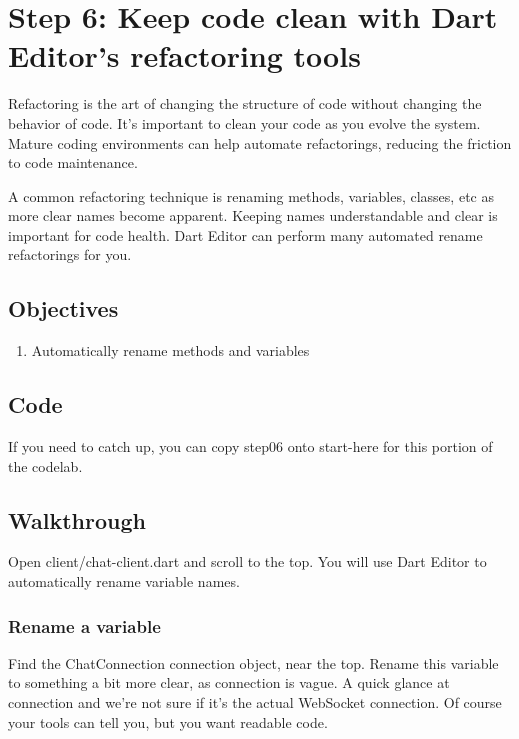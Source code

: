 \section{Step 6: Keep code clean with Dart Editor’s refactoring tools}

Refactoring is the art of changing the structure of code without changing the behavior of code. It’s important to clean your code as you evolve the system. Mature coding environments can help automate refactorings, reducing the friction to code maintenance.

A common refactoring technique is renaming methods, variables, classes, etc as more clear names become apparent. Keeping names understandable and clear is important for code health. Dart Editor can perform many automated rename refactorings for you.

\subsection{Objectives}

\begin{enumerate}
\item Automatically rename methods and variables
\end{enumerate}

\subsection{Code}

If you need to catch up, you can copy step06 onto start-here for this portion of the codelab.

\subsection{Walkthrough}

Open client/chat-client.dart and scroll to the top. You will use Dart Editor to
automatically rename variable names.

\subsubsection{Rename a variable}

Find the ChatConnection connection object, near the top. Rename this variable to
something a bit more clear, as connection is vague. A quick glance at connection and we’re not sure if it’s the actual WebSocket connection. Of course your tools can tell you, but you want readable code.

